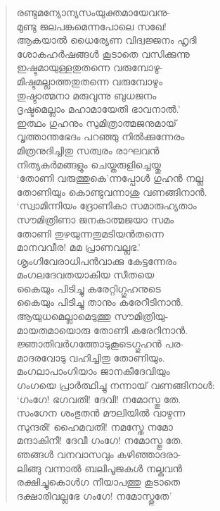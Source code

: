 \begin{verse}
രണ്ടുമന്യോന്യസംയുക്തമായേവനു-\\
മുണ്ടു ജലപങ്കമെന്നപോലെ സഖേ!\\
ആകയാല്‍ ധൈര്യേണ വിദ്വജ്ജനം	ഹൃദി\\
ശോകഹര്‍ഷങ്ങള്‍ കൂടാതെ വസിക്കുന്നു\\
ഇഷ്ടമായുള്ളതുതന്നെ വരുമ്പോഴു-\\
മിഷ്ടമല്ലാത്തതുതന്നെ വരുമ്പോഴും\\
തുഷ്ടാത്മനാ മരുവുന്നു ബുധജനം\\
ദൃഷ്ടമെല്ലാം മഹാമായേതി ഭാവനാല്‍.’\\
ഇത്ഥം ഗുഹനും സുമിത്രാത്മജനുമായ്\\
വൃത്താന്തഭേദം പറഞ്ഞു നില്‍ക്കുന്നേരം\\
മിത്രനുദിച്ചിതു സത്വരം രാഘവന്‍\\
നിത്യകര്‍മങ്ങളും ചെയ്തരുളിച്ചെയ്തു\\
‘തോണി വരുത്തുകെ’ന്നപ്പോള്‍ ഗുഹന്‍ നല്ല\\
തോണിയും കൊണ്ടുവന്നാശു വണങ്ങിനാന്‍.\\
‘സ്വാമിന്നിയം ദ്രോണികാ സമാരുഹ്യതാം\\
സൗമിത്രിണാ ജനകാത്മജയാ സമം\\
തോണി തുഴയുന്നതുമടിയന്‍തന്നെ\\
മാനവവീര! മമ പ്രാണവല്ലഭ.’\\
ശൃംഗിവേരാധിപന്‍വാക്കു കേട്ടന്നേരം\\
മംഗലദേവതയാകിയ സീതയെ\\
കൈയും പിടിച്ചു കരേറ്റിഗ്ഗുഹനുടെ\\
കൈയും പിടിച്ചു താനും കരേറീടിനാന്‍.\\
ആയുധമെല്ലാമെടുത്തു സൗമിത്രിയു-\\
മായതമായൊരു തോണി കരേറിനാന്‍.\\
ജ്ഞാതിവര്‍ഗത്തോടുകൂടെഗ്ഗുഹന്‍ പര-\\
മാദരവോടു വഹിച്ചിതു തോണിയും.\\
മംഗലാപാംഗിയാം ജാനകീദേവിയും\\
ഗംഗയെ പ്രാര്‍ത്ഥിച്ചു നന്നായ് വണങ്ങിനാള്‍:\\
‘ഗംഗേ! ഭഗവതി! ദേവി! നമോസ്തു തേ.\\
സംഗേന ശംഭുതന്‍ മൗലിയില്‍ വാഴുന്ന\\
സുന്ദരി! ഹൈമവതി! നമസ്തേ നമോ\\
മന്ദാകിനീ! ദേവീ ഗംഗേ! നമോസ്തു തേ.\\
ഞങ്ങള്‍ വനവാസവും കഴിഞ്ഞാദരാ-\\
ലിങ്ങു വന്നാല്‍ ബലിപൂജകള്‍ നല്കുവന്‍\\
രക്ഷിച്ചുകൊള്‍ഗ നീയാപത്തു കൂടാതെ\\
ദക്ഷാരിവല്ലഭേ ഗംഗേ! നമോസ്തുതേ’\\

\end{verse}

